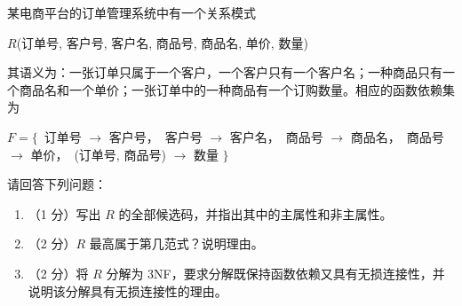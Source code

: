 \documentclass[a4paper,11pt]{article}
\begin{document}
\q 某电商平台的订单管理系统中有一个关系模式

\begin{center}
$R$(订单号, 客户号, 客户名, 商品号, 商品名, 单价, 数量)
\end{center}

\noindent 其语义为：一张订单只属于一个客户，一个客户只有一个客户名；一种商品只有一个商品名和一个单价；一张订单中的一种商品有一个订购数量。相应的函数依赖集为

\begin{center}
$F=\{$\ 订单号 $\to$ 客户号，\ 客户号 $\to$ 客户名，\ 商品号 $\to$ 商品名，\ 商品号 $\to$ 单价，\ (订单号, 商品号) $\to$ 数量 $\}$
\end{center}

请回答下列问题：
\begin{enumerate}[label=（\arabic*）, leftmargin=2.4em, itemsep=1pt]
  \item（1 分）写出 $R$ 的全部候选码，并指出其中的主属性和非主属性。
  \item（2 分）$R$ 最高属于第几范式？说明理由。
  \item（2 分）将 $R$ 分解为 3NF，要求分解既保持函数依赖又具有无损连接性，并说明该分解具有无损连接性的理由。
\end{enumerate}
\anslines{5.6cm}
\end{document}
